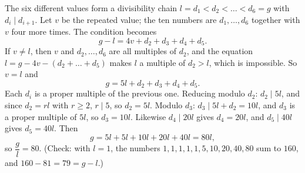 The six different values form a divisibility chain $l=d_1<d_2<\dots<d_6=g$ with $d_i\mid d_{i+1}$. Let $v$ be the repeated value; the ten numbers are $d_1,\dots,d_6$ together with $v$ four more times. The condition becomes
\[g-l=4v+d_2+d_3+d_4+d_5.\]
If $v\ne l$, then $v$ and $d_2,\dots,d_6$ are all multiples of $d_2$, and the equation $l=g-4v-(d_2+\dots+d_5)$ makes $l$ a multiple of $d_2>l$, which is impossible. So $v=l$ and
\[g=5l+d_2+d_3+d_4+d_5.\]
Each $d_i$ is a proper multiple of the previous one. Reducing modulo $d_2$: $d_2\mid5l$, and since $d_2=rl$ with $r\ge2$, $r\mid5$, so $d_2=5l$. Modulo $d_3$: $d_3\mid5l+d_2=10l$, and $d_3$ is a proper multiple of $5l$, so $d_3=10l$. Likewise $d_4\mid20l$ gives $d_4=20l$, and $d_5\mid40l$ gives $d_5=40l$. Then
\[g=5l+5l+10l+20l+40l=80l,\]
so $\dfrac gl=\boxed{80}$. (Check: with $l=1$, the numbers $1,1,1,1,1,5,10,20,40,80$ sum to $160$, and $160-81=79=g-l$.)
